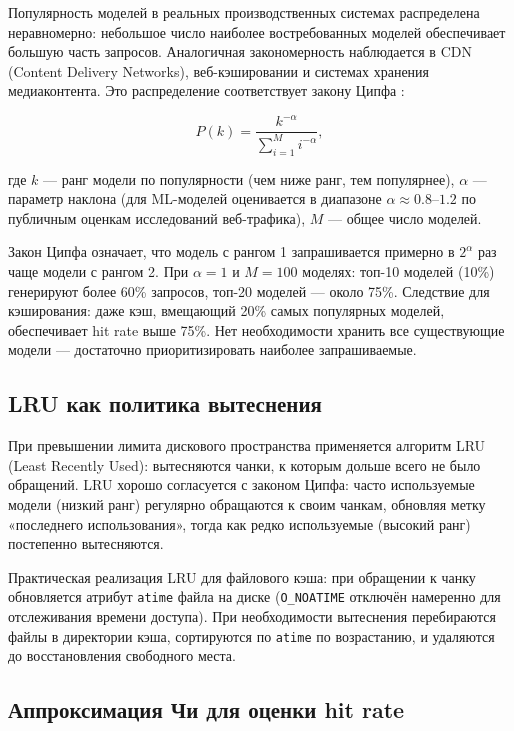 Популярность моделей в реальных производственных системах распределена неравномерно: небольшое число наиболее востребованных моделей обеспечивает большую часть запросов. Аналогичная закономерность наблюдается в CDN (Content Delivery Networks), веб-кэшировании и системах хранения медиаконтента. Это распределение соответствует закону Ципфа \cite{zipf_law}:

\begin{equation}
P(k) = \frac{k^{-\alpha}}{\sum_{i=1}^{M} i^{-\alpha}},
\label{eq:zipf}
\end{equation}

где $k$ --- ранг модели по популярности (чем ниже ранг, тем популярнее), $\alpha$ --- параметр наклона (для ML-моделей оценивается в диапазоне $\alpha \approx 0.8$--$1.2$ по публичным оценкам исследований веб-трафика), $M$ --- общее число моделей.

Закон Ципфа означает, что модель с рангом 1 запрашивается примерно в $2^\alpha$ раз чаще модели с рангом 2. При $\alpha = 1$ и $M = 100$ моделях: топ-10 моделей (10\%) генерируют более 60\% запросов, топ-20 моделей --- около 75\%. Следствие для кэширования: даже кэш, вмещающий 20\% самых популярных моделей, обеспечивает hit rate выше 75\%. Нет необходимости хранить все существующие модели --- достаточно приоритизировать наиболее запрашиваемые.

\subsection*{LRU как политика вытеснения}

При превышении лимита дискового пространства применяется алгоритм LRU (Least Recently Used): вытесняются чанки, к которым дольше всего не было обращений. LRU хорошо согласуется с законом Ципфа: часто используемые модели (низкий ранг) регулярно обращаются к своим чанкам, обновляя метку «последнего использования», тогда как редко используемые (высокий ранг) постепенно вытесняются.

Практическая реализация LRU для файлового кэша: при обращении к чанку обновляется атрибут \texttt{atime} файла на диске (\texttt{O\_NOATIME} отключён намеренно для отслеживания времени доступа). При необходимости вытеснения перебираются файлы в директории кэша, сортируются по \texttt{atime} по возрастанию, и удаляются до восстановления свободного места.

\subsection*{Аппроксимация Чи для оценки hit rate}

